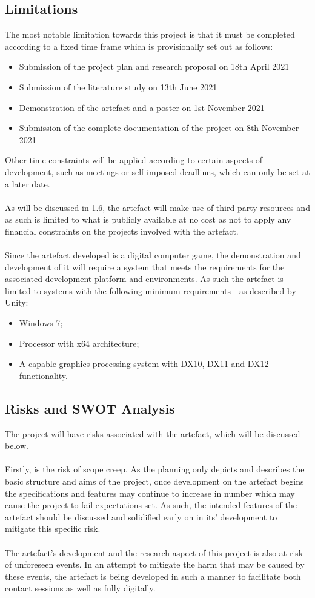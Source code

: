 \subsection{Limitations}
The most notable limitation towards this project is that it must be completed according to a fixed time frame which is provisionally set out as follows:
\begin{itemize}
\item Submission of the project plan and research proposal on 18th April 2021
\item Submission of the literature study on 13th June 2021
\item Demonstration of the artefact and a poster on 1st November 2021
\item Submission of the complete documentation of the project on 8th November 2021
\end{itemize}
Other time constraints will be applied according to certain aspects of development, such as meetings or self-imposed deadlines, which can only be set at a later date.
\\\\
As will be discussed in 1.6, the artefact will make use of third party resources and as such is limited to what is publicly available at no cost as not to apply any financial constraints on the projects involved with the artefact.
\\\\
Since the artefact developed is a digital computer game, the demonstration and development of it will require a system that meets the requirements for the associated development platform and environments. As such the artefact is limited to systems with the following minimum requirements - as described by Unity:
\begin{itemize}
\item Windows 7;
\item Processor with x64 architecture;
\item A capable graphics processing system with DX10, DX11 and DX12 functionality.
\end{itemize}
\pagebreak
\subsection{Risks and SWOT Analysis}
The project will have risks associated with the artefact, which will be discussed below.
\\\\
Firstly, is the risk of scope creep. As the planning only depicts and describes the basic structure and aims of the project, once development on the artefact begins the specifications and features may continue to increase in number which may cause the project to fail expectations set. As such, the intended features of the artefact should be discussed and solidified early on in its’ development to mitigate this specific risk.
\\\\
The artefact's development and the research aspect of this project is also at risk of unforeseen events. In an attempt to mitigate the harm that may be caused by these events, the artefact is being developed in such a manner to facilitate both contact sessions as well as fully digitally.

